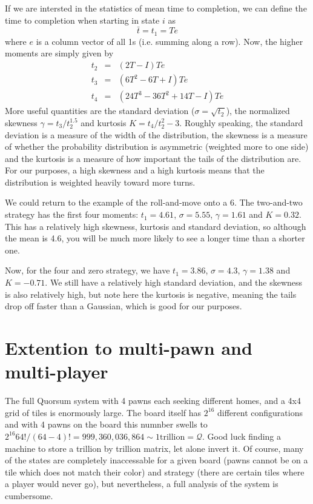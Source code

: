 \documentclass[letterpaper,11pt]{article}
\begin{document}
If we are intersted in the statistics of mean time to completion, we can define
the time to completion when starting in state $i$ as
\[
	\bar{t}=t_1=Te
\]
where $e$ is a column vector of all 1s (i.e. summing along a row).  Now, the
higher moments are simply given by
\[
	\begin{array}{rcl}
		t_2 & = & (2T-I)Te \\
		t_3 & = & (6T^2-6T+I)Te \\
		t_4 & = & (24T^3-36T^2+14T-I)Te
	\end{array}
\]
More useful quantities are the standard deviation ($\sigma = \sqrt{t_2}$),
the normalized skewness $\gamma=t_3/t_2^{1.5}$ and kurtosis $K=t_4/t_2^2-3$.
Roughly speaking, the standard deviation is a measure of the width of the 
distribution, the skewness is a measure of whether the probability
distribution is asymmetric (weighted more to one side) and the kurtosis is a
measure of how important the tails of the distribution are.  For our purposes,
a high skewness and a high kurtosis means that the distribution is weighted
heavily toward more turns.

We could return to the example of the roll-and-move onto a 6.  The two-and-two
strategy has the first four moments: $t_1=4.61$, $\sigma=5.55$, $\gamma=1.61$
and $K=0.32$.  This has a relatively high skewness, kurtosis and standard
deviation, so although the mean is 4.6, you will be much more likely to see a
longer time than a shorter one.

Now, for the four and zero strategy, we have $t_1=3.86$, $\sigma=4.3$, $\gamma=
1.38$ and $K=-0.71$.  We still have a relatively high standard deviation, and
the skewness is also relatively high, but note here the kurtosis is negative,
meaning the tails drop off faster than a Gaussian, which is good for our
purposes.  

\section{Extention to multi-pawn and multi-player}
The full Quorsum system with 4 pawns each seeking different homes, and a 4x4
grid of tiles is enormously large.  The board itself has $2^{16}$ different
configurations and with 4 pawns on the board this numnber swells to 
$2^{16} 64!/(64-4)! = 999,360,036,864 \sim \mathrm{1 trillion}=\mathcal{Q}$.
Good luck finding a machine to store a trillion by trillion matrix, let alone
invert it.  Of course, many of the states are completely inaccessable for a
given board (pawns cannot be on a tile which does not match their color)
and strategy (there are certain tiles where a player would never go), but
nevertheless, a full analysis of the system is cumbersome.
\end{document}
